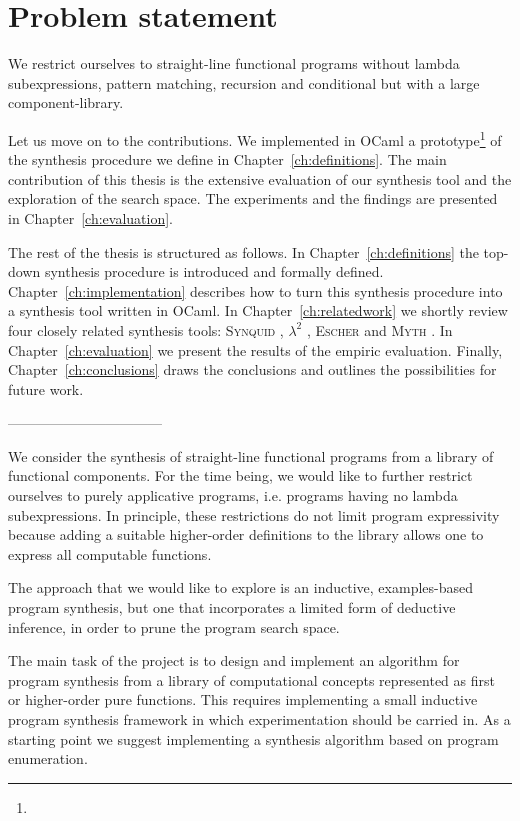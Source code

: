 \section{Problem statement}\label{Problem}

We restrict ourselves to straight-line functional programs without lambda subexpressions, pattern matching, recursion and conditional but with a large component-library.



Let us move on to the contributions. We implemented in OCaml a prototype\footnote{} of the synthesis procedure we define in Chapter~\ref{ch:definitions}. The main contribution of this thesis is the extensive evaluation of our synthesis tool and the exploration of the search space. The experiments and the findings are presented in Chapter~\ref{ch:evaluation}.

The rest of the thesis is structured as follows. In Chapter~\ref{ch:definitions} the top-down synthesis procedure is introduced and formally defined. Chapter~\ref{ch:implementation} describes how to turn this synthesis procedure into a synthesis tool written in OCaml. In Chapter~\ref{ch:relatedwork} we shortly review four closely related synthesis tools: \textsc{Synquid} \cite{SynquidPaper}, $\lambda^2$ \cite{LambdaSquarePaper}, \textsc{Escher} \cite{EscherPaper} and \textsc{Myth} \cite{MythPaper}. In Chapter~\ref{ch:evaluation} we present the results of the empiric evaluation. Finally, Chapter~\ref{ch:conclusions} draws the conclusions and outlines the possibilities for future work.

---------------------------------


We consider the synthesis of straight-line functional programs from a library of functional components.  For the time being, we would like to further restrict ourselves to purely applicative programs, i.e. programs having no lambda subexpressions.  In principle, these restrictions do not limit program expressivity because adding a suitable higher-order definitions to the library allows one to express all computable functions.


The approach that we would like to explore is an inductive, examples-based program synthesis, but one that incorporates a limited form of deductive inference, in order to prune the program search space. 

The main task of the project is to design and implement an algorithm for program synthesis from a library of computational concepts represented as first or higher-order pure functions.  This requires implementing a small inductive program synthesis framework in which experimentation should be carried in.  As a starting point we suggest implementing a synthesis algorithm based on program enumeration.

